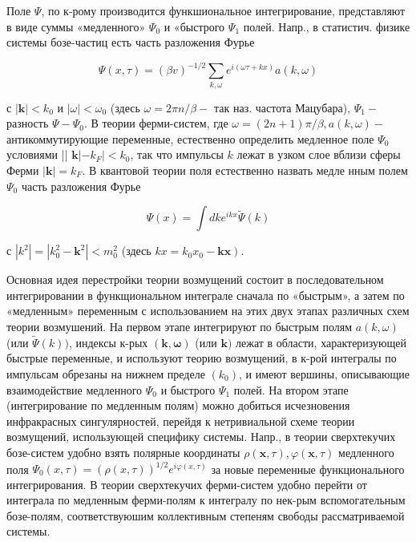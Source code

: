 \documentclass[10pt]{article}
\begin{document}
Поле $\Psi$, по к-рому производится функшиональное интегрирование, представляют в виде суммы «медленного» $\Psi_{0}$ и «быстрого $\Psi_{1}$ полей. Напр., в статистич. физике системы бозе-частиц есть часть разложения Фурье



\[

\Psi(x, \tau)=(\beta v)^{-1 / 2} \sum_{k, \omega} e^{i(\omega \tau+k x)} a(k, \omega)

\]



с $|\boldsymbol{k}|<k_{0}$ и $|\omega|<\omega_{0}$ (здесь $\omega=2 \pi n / \beta-$ так наз. частота Мацубара), $\Psi_{1}-$ разность $\Psi-\Psi_{0}$. В теории ферми-систем, где $\omega=(2 n+1) \pi / \beta, a(k, \omega)-$ антикоммутирующие переменные, естественно определить медленное поле $\Psi_{0}$ условиями || $\boldsymbol{k}\left|-k_{F}\right|<k_{0}$, так что импульсы $k$ лежат в узком слое вблизи сферы Ферми $|\boldsymbol{k}|=k_{F}$. В квантовой теории поля естественно назвать медле нным полем $\Psi_{0}$ часть разложения Фурье



\[

\Psi(x)=\int d k e^{i k x} \tilde{\Psi}(k)

\]



с $\left|k^{2}\right|=\left|k_{0}^{2}-\boldsymbol{k}^{2}\right|<m_{0}^{2}$ (здесь $\left.k x=k_{0} x_{0}-\boldsymbol{k x}\right)$.



Основная идея перестройки теории возмущений состоит в последовательном интегрировании в функщиональном интеграле сначала по «быстрым», а затем по «медленным» переменным с использованием на этих двух этапах различных схем теории возмушений. На первом этапе интегрируют по быстрым полям $a(k, \omega)$ (или $\widetilde{\Psi}(k))$, индексы к-рых $(\boldsymbol{k}, \boldsymbol{\omega})$ (или $\boldsymbol{k})$ лежат в области, характеризующей быстрые переменные, и используют теорию возмущений, в к-рой интегралы по импульсам обрезаны на нижнем пределе $\left(k_{0}\right)$, и имеют вершины, описывающие взаимодействие медленного $\Psi_{0}$ и быстрого $\Psi_{1}$ полей. На втором этапе (интегрирование по медленным полям) можно добиться исчезновения инфракрасных сингулярностей, перейдя к нетривиальной схеме теории возмущений, использующей специфику системы. Напр., в теории сверхтекучих бозе-систем удобно взять полярные координаты $\rho(\boldsymbol{x}, \tau), \varphi(\boldsymbol{x}, \tau)$ медленного поля $\Psi_{0}(x, \tau)=(\rho(x, \tau))^{1 / 2} e^{i \varphi(x, \tau)}$ за новые переменные функционального интегрирования. В теории сверхтекучих ферми-систем удобно перейти от интеграла по медленным ферми-полям к интегралу по нек-рым вспомогательным бозе-полям, соответствуюшим коллективным степеням свободы рассматриваемой системы.
\end{document}
